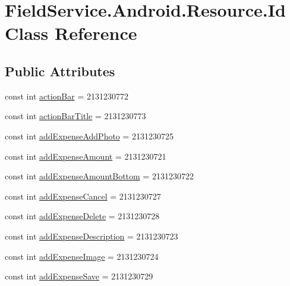 \hypertarget{class_field_service_1_1_android_1_1_resource_1_1_id}{\section{Field\+Service.\+Android.\+Resource.\+Id Class Reference}
\label{class_field_service_1_1_android_1_1_resource_1_1_id}
}
\subsection*{Public Attributes}
\begin{DoxyCompactItemize}
\item 
const int \hyperlink{class_field_service_1_1_android_1_1_resource_1_1_id_a48e17f6d9095f3a37c30095ff79e0fc5}{action\+Bar} = 2131230772
\item 
const int \hyperlink{class_field_service_1_1_android_1_1_resource_1_1_id_a023297d45881ce9feadc278f07ab69b4}{action\+Bar\+Title} = 2131230773
\item 
const int \hyperlink{class_field_service_1_1_android_1_1_resource_1_1_id_a093f49b61c8ee6043a4d34bae7756a7a}{add\+Expense\+Add\+Photo} = 2131230725
\item 
const int \hyperlink{class_field_service_1_1_android_1_1_resource_1_1_id_aea1305c6f04f1cfb98655ae55a5bcae5}{add\+Expense\+Amount} = 2131230721
\item 
const int \hyperlink{class_field_service_1_1_android_1_1_resource_1_1_id_a7da4e0a63febb4d629b13cc55f6a5757}{add\+Expense\+Amount\+Bottom} = 2131230722
\item 
const int \hyperlink{class_field_service_1_1_android_1_1_resource_1_1_id_aafa692de546c5159209e16a3e7aa6858}{add\+Expense\+Cancel} = 2131230727
\item 
const int \hyperlink{class_field_service_1_1_android_1_1_resource_1_1_id_aaf3f2fe55869570c16cc64b1f8a61b36}{add\+Expense\+Delete} = 2131230728
\item 
const int \hyperlink{class_field_service_1_1_android_1_1_resource_1_1_id_aa429ac59b7fcfe20494a48cd2472b88f}{add\+Expense\+Description} = 2131230723
\item 
const int \hyperlink{class_field_service_1_1_android_1_1_resource_1_1_id_a26fc14fb271a4931851c5399dbd2bdad}{add\+Expense\+Image} = 2131230724
\item 
const int \hyperlink{class_field_service_1_1_android_1_1_resource_1_1_id_a306bb67eeb826be3de30508c658d6400}{add\+Expense\+Save} = 2131230729

\end{DoxyCompactItemize}
